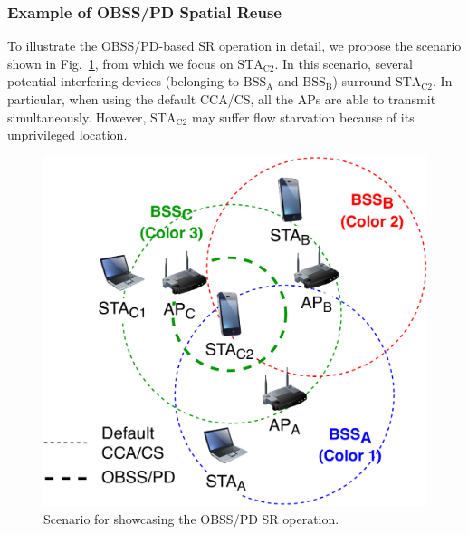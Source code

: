\documentclass{ieeeaccess}
\begin{document}
\subsubsection{Example of OBSS/PD Spatial Reuse}
To illustrate the OBSS/PD-based SR operation in detail, we propose the scenario shown in Fig.~\ref{fig:fig_8_a}, from which we focus on $\text{STA}_\text{C2}$. In this scenario, several potential interfering devices (belonging to $\text{BSS}_\text{A}$ and $\text{BSS}_\text{B}$) surround $\text{STA}_\text{C2}$. In particular, when using the default CCA/CS, all the APs are able to transmit simultaneously. However, $\text{STA}_\text{C2}$ may suffer flow starvation because of its unprivileged location.
\begin{figure}[ht!]
	\centering
	\includegraphics[width=0.75\columnwidth]{fig_11}
	\caption{Scenario for showcasing the OBSS/PD SR operation.}
	\label{fig:fig_8_a}
\end{figure}
\end{document}
